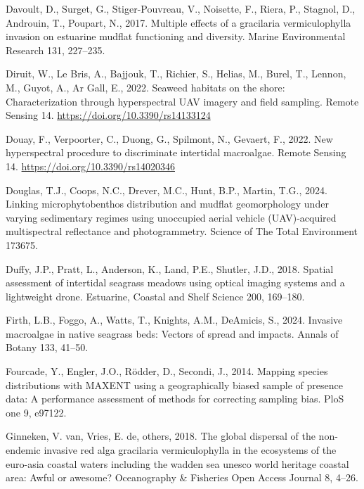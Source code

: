 \documentclass[
  letterpaper,
  DIV=11,
  numbers=noendperiod]{scrartcl}
\newlength{\cslhangindent}
\newenvironment{CSLReferences}[2] %
 {\begin{list}{}{%
  \setlength{\itemindent}{0pt}
  \setlength{\leftmargin}{0pt}
  \setlength{\parsep}{0pt}
  \ifodd #1
   \setlength{\leftmargin}{\cslhangindent}
   \setlength{\itemindent}{-1\cslhangindent}
  \fi
  \setlength{\itemsep}{#2\baselineskip}}}
 {\end{list}}
\begin{document}
\begin{CSLReferences}{1}{0}
Davoult, D., Surget, G., Stiger-Pouvreau, V., Noisette, F., Riera, P.,
Stagnol, D., Androuin, T., Poupart, N., 2017. Multiple effects of a
gracilaria vermiculophylla invasion on estuarine mudflat functioning and
diversity. Marine Environmental Research 131, 227--235.

Diruit, W., Le Bris, A., Bajjouk, T., Richier, S., Helias, M., Burel,
T., Lennon, M., Guyot, A., Ar Gall, E., 2022. Seaweed habitats on the
shore: Characterization through hyperspectral UAV imagery and field
sampling. Remote Sensing 14. \url{https://doi.org/10.3390/rs14133124}

Douay, F., Verpoorter, C., Duong, G., Spilmont, N., Gevaert, F., 2022.
New hyperspectral procedure to discriminate intertidal macroalgae.
Remote Sensing 14. \url{https://doi.org/10.3390/rs14020346}

Douglas, T.J., Coops, N.C., Drever, M.C., Hunt, B.P., Martin, T.G.,
2024. Linking microphytobenthos distribution and mudflat geomorphology
under varying sedimentary regimes using unoccupied aerial vehicle
(UAV)-acquired multispectral reflectance and photogrammetry. Science of
The Total Environment 173675.

Duffy, J.P., Pratt, L., Anderson, K., Land, P.E., Shutler, J.D., 2018.
Spatial assessment of intertidal seagrass meadows using optical imaging
systems and a lightweight drone. Estuarine, Coastal and Shelf Science
200, 169--180.

Firth, L.B., Foggo, A., Watts, T., Knights, A.M., DeAmicis, S., 2024.
Invasive macroalgae in native seagrass beds: Vectors of spread and
impacts. Annals of Botany 133, 41--50.

Fourcade, Y., Engler, J.O., Rödder, D., Secondi, J., 2014. Mapping
species distributions with MAXENT using a geographically biased sample
of presence data: A performance assessment of methods for correcting
sampling bias. PloS one 9, e97122.

Ginneken, V. van, Vries, E. de, others, 2018. The global dispersal of
the non-endemic invasive red alga gracilaria vermiculophylla in the
ecosystems of the euro-asia coastal waters including the wadden sea
unesco world heritage coastal area: Awful or awesome? Oceanography \&
Fisheries Open Access Journal 8, 4--26.


\end{CSLReferences}
\end{document}
